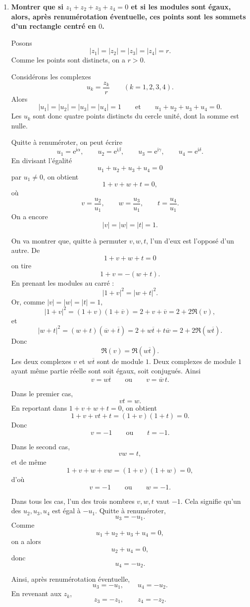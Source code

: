 \documentclass[11pt,a4paper]{article}
\newcommand{\ii}{\mathrm{i}}
\newcommand{\e}{\mathrm{e}}
\begin{document}
\begin{enumerate}[label=\textbf{D2.\arabic*.}]
    \item \textbf{Montrer que si \(z_1+z_2+z_3+z_4=0\) et si les modules sont égaux, alors, après renumérotation éventuelle, ces points sont les sommets d’un rectangle centré en \(0\).}

Posons
\[
|z_1|=|z_2|=|z_3|=|z_4|=r.
\]
Comme les points sont distincts, on a \(r>0\).

Considérons les complexes
\[
u_k=\frac{z_k}{r}\qquad (k=1,2,3,4).
\]
Alors
\[
|u_1|=|u_2|=|u_3|=|u_4|=1
\qquad\text{et}\qquad
u_1+u_2+u_3+u_4=0.
\]
Les \(u_k\) sont donc quatre points distincts du cercle unité, dont la somme est nulle.

Quitte à renuméroter, on peut écrire
\[
u_1=\e^{\ii\alpha},\qquad u_2=\e^{\ii\beta},\qquad
u_3=\e^{\ii\gamma},\qquad u_4=\e^{\ii\delta}.
\]
En divisant l’égalité
\[
u_1+u_2+u_3+u_4=0
\]
par \(u_1\neq 0\), on obtient
\[
1+v+w+t=0,
\]
où
\[
v=\frac{u_2}{u_1},\qquad
w=\frac{u_3}{u_1},\qquad
t=\frac{u_4}{u_1}.
\]
On a encore
\[
|v|=|w|=|t|=1.
\]

On va montrer que, quitte à permuter \(v,w,t\), l’un d’eux est l’opposé d’un autre.  
De
\[
1+v+w+t=0
\]
on tire
\[
1+v=-(w+t).
\]
En prenant les modules au carré :
\[
|1+v|^2=|w+t|^2.
\]
Or, comme \(|v|=|w|=|t|=1\),
\[
|1+v|^2=(1+v)(1+\overline v)=2+v+\overline v=2+2\Re(v),
\]
et
\[
|w+t|^2=(w+t)(\overline w+\overline t)=2+w\overline t+t\overline w
=2+2\Re(w\overline t).
\]
Donc
\[
\Re(v)=\Re(w\overline t).
\]
Les deux complexes \(v\) et \(w\overline t\) sont de module \(1\). Deux complexes de module \(1\) ayant même partie réelle sont soit égaux, soit conjugués. Ainsi
\[
v=w\overline t
\qquad\text{ou}\qquad
v=\overline w\,t.
\]

Dans le premier cas,
\[
vt=w.
\]
En reportant dans \(1+v+w+t=0\), on obtient
\[
1+v+vt+t=(1+v)(1+t)=0.
\]
Donc
\[
v=-1 \qquad\text{ou}\qquad t=-1.
\]

Dans le second cas,
\[
vw=t,
\]
et de même
\[
1+v+w+vw=(1+v)(1+w)=0,
\]
d’où
\[
v=-1 \qquad\text{ou}\qquad w=-1.
\]

Dans tous les cas, l’un des trois nombres \(v,w,t\) vaut \(-1\). Cela signifie qu’un des \(u_2,u_3,u_4\) est égal à \(-u_1\). Quitte à renuméroter,
\[
u_3=-u_1.
\]
Comme
\[
u_1+u_2+u_3+u_4=0,
\]
on a alors
\[
u_2+u_4=0,
\]
donc
\[
u_4=-u_2.
\]

Ainsi, après renumérotation éventuelle,
\[
u_3=-u_1,\qquad u_4=-u_2.
\]
En revenant aux \(z_k\),
\[
z_3=-z_1,\qquad z_4=-z_2.
\]


\end{enumerate}
\end{document}
